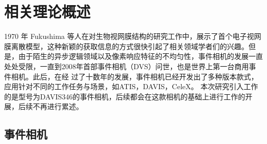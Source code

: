 \chapter{相关理论概述}
1970 年 Fukushima 等人\cite{fukushima1970electronic}在对生物视网膜结构的研究工作中，展示了首个电子视网膜离散模型，这种新颖的获取信息的方式很快引起了相关领域学者们的兴趣。但是，由于陌生的异步逻辑领域以及像素响应特征的不均匀性，事件相机的发展一直处处受限，一直到2008年首部事件相机（DVS）问世，也是世界上第一台商用事件相机。此后，在经
过了十数年的发展，事件相机已经开发出了多种版本款式，应用针对不同的工作任务与场景，如ATIS，DAVIS，CeleX。
本次研究引入工作的是型号为DAVIS346的事件相机，后续都会在这款相机的基础上进行工作的开展，后续不再进行累述。

\section{事件相机}
